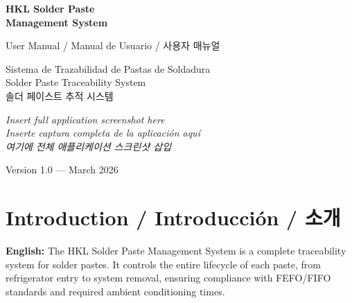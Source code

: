 \documentclass[12pt,a4paper]{article}
\begin{document}
\begin{titlepage}
\centering
\vspace*{3cm}

{\Huge\bfseries\textcolor{hkldark}{HKL Solder Paste\\Management System}\par}
\vspace{0.5cm}
{\Large\textcolor{hklblue}{User Manual / Manual de Usuario / 사용자 매뉴얼}\par}
\vspace{1cm}
{\large\textcolor{hklgray}{Sistema de Trazabilidad de Pastas de Soldadura\\Solder Paste Traceability System\\솔더 페이스트 추적 시스템}\par}

\vspace{2cm}

\begin{photobox}
\centering
\vspace{3cm}
\textit{Insert full application screenshot here\\
Inserte captura completa de la aplicación aquí\\
여기에 전체 애플리케이션 스크린샷 삽입}
\vspace{1cm}

\end{photobox}

\vfill
{\small Version 1.0 — March 2026\par}
\end{titlepage}

\tableofcontents
\newpage

\section{Introduction / Introducción / 소개}

\textbf{English:}
The HKL Solder Paste Management System is a complete traceability system for solder pastes. It controls the entire lifecycle of each paste, from refrigerator entry to system removal, ensuring compliance with FEFO/FIFO standards and required ambient conditioning times.
\end{document}
